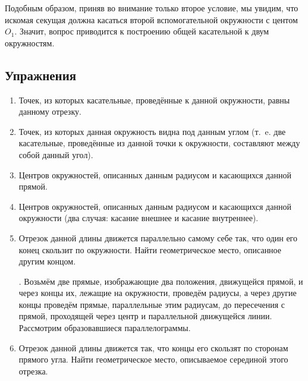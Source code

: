\documentclass[oneside]{book}
\begin{document}
Подобным образом, приняв во внимание только второе условие, мы увидим, что искомая секущая должна касаться второй вспомогательной окружности с центом $O_1$.
Значит, вопрос приводится к построению общей касательной к двум окружностям.

\subsection*{Упражнения}

\begin{center}
\end{center}

\begin{enumerate}

 \item
Точек, из которых касательные, проведённые к данной окружности, равны данному отрезку.

 \item
Точек, из которых данная окружность видна под данным углом (т.~e.
две касательные, проведённые из данной точки к окружности, составляют между собой данный угол).

 \item
Центров окружностей, описанных данным радиусом и касающихся данной прямой.

 \item
Центров окружностей, описанных данным радиусом и касающихся данной окружности (два случая:
касание внешнее и касание внутреннее).

 \item
Отрезок данной длины движется параллельно самому себе так, что один его конец скользит по окружности.
Найти геометрическое место, описанное другим концом.

.
Возьмём две прямые, изображающие два положения, движущейся прямой, и через концы их, лежащие на окружности, проведём радиусы, а через другие концы проведём прямые, параллельные этим радиусам, до пересечения с прямой, проходящей через центр и параллельной движущейся линии.
Рассмотрим образовавшиеся параллелограммы.

 \item
Отрезок данной длины движется так, что концы его скользят по сторонам прямого угла.
Найти геометрическое место, описываемое серединой этого отрезка.

\end{enumerate}

\begin{center}
\end{center}
\end{document}
